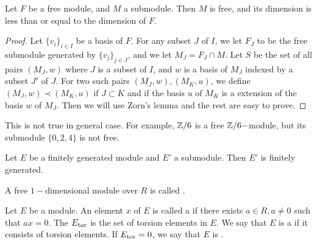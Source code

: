  \begin{thm}
    Let $F$ be a free module, and $M$ a submodule. Then $M$ is free, and its dimension is less than or equal to the dimension of $F$.
  \end{thm}
  \begin{proof}
    Let $\{v_i\}_{i\in I}$ be a basis of $F$. For any subset $J$ of $I$, we let $F_J$ to be the free submodule generated by $\{v_j\}_{j\in J}$, and we let $M_J=F_J\cap M$. Let $S$ be the set of all pairs $(M_J,w)$ where $J$ is a subset of $I$, and $w$ is a basis of $M_J$ indexed by a subset $J'$ of $J$. For two such pairs $(M_J,w), (M_K,u)$, we define $(M_J,w)\prec(M_K,u)$ if $J\subset K$ and if the basis $u$ of $M_K$ is a extension of the basis $w$ of $M_J$. Then we will use Zorn's lemma and the rest are easy to prove.
  \end{proof}
  \begin{warn}
    This is not true in general case. For example, ${\mathbb Z}/6$ is a free ${\mathbb Z}/6-$module, but  its submodule $\{0,2,4\}$ is not free.
  \end{warn}

  \begin{cor}
    Let $E$ be a finitely generated module and $E'$ a submodule. Then $E'$ is finitely generated.
  \end{cor}

  \begin{defn}
    A free $1-$dimensional module over $R$ is called .
  \end{defn}
  \begin{defn}
    Let $E$ be a module. An element $x$ of $E$ is called a  if there exists $a\in R,a\neq0$ such that $ax=0$. The  $E_{\operatorname{tor}}$ is the set of torsion elements in $E$.
    We say that $E$ is a  if it consists of torsion elements.
    If $E_{\operatorname{tor}}=0$, we say that $E$ is .
  \end{defn}

